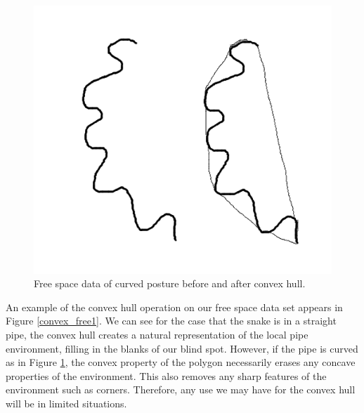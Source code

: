 \begin{figure}
  \begin{center}
    \includegraphics[scale=0.9]{4_convex_freespace2.png}
  \end{center}
  \caption{Free space data of curved posture before and after convex hull.}
	\label{convex_free2}
\end{figure}

An example of the convex hull operation on our free space data set appears in Figure \ref{convex_free1}.  We can see for the case that the snake is in a straight pipe, the convex hull creates a natural representation of the local pipe environment, filling in the blanks of our blind spot.  However, if the pipe is curved as in Figure \ref{convex_free2}, the convex property of the polygon necessarily erases any concave properties of the environment.  This also removes any sharp features of the environment such as corners.  Therefore, any use we may have for the convex hull will be in limited situations.




